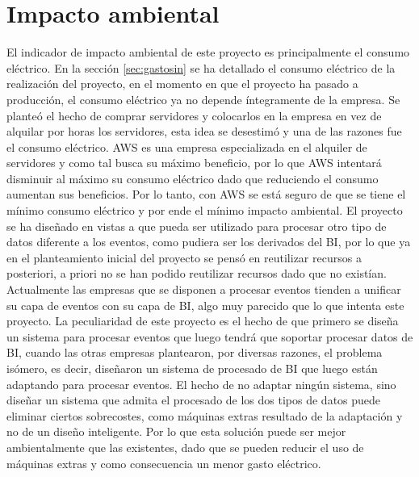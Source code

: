 \section{Impacto ambiental}\label{sec:imam}
El indicador de impacto ambiental de este proyecto es principalmente el consumo eléctrico. En la sección \ref{sec:gastosin} se ha detallado el consumo eléctrico de la realización del proyecto, en el momento en que el proyecto ha pasado a producción, el consumo eléctrico ya no depende íntegramente de la empresa. Se planteó el hecho de comprar servidores y colocarlos en la empresa en vez de alquilar por horas los servidores, esta idea se desestimó y una de las razones fue el consumo eléctrico. AWS es una empresa especializada en el alquiler de servidores y como tal busca su máximo beneficio, por lo que AWS intentará disminuir al máximo su consumo eléctrico dado que reduciendo el consumo aumentan sus beneficios. Por lo tanto, con AWS se está seguro de que se tiene el mínimo consumo eléctrico y por ende el mínimo impacto ambiental.
El proyecto se ha diseñado en vistas a que pueda ser utilizado para procesar otro tipo de datos diferente a los eventos, como pudiera ser los derivados del BI, por lo que ya en el planteamiento inicial del proyecto se pensó en reutilizar recursos a posteriori, a priori no se han podido reutilizar recursos dado que no existían. 
Actualmente las empresas que se disponen a procesar eventos tienden a unificar su capa de eventos con su capa de BI, algo muy parecido que lo que intenta este proyecto. La peculiaridad de este proyecto es el hecho de que primero se diseña un sistema para procesar eventos que luego tendrá que soportar procesar datos de BI, cuando las otras empresas plantearon, por diversas razones, el problema isómero, es decir, diseñaron un sistema de procesado de BI que luego están adaptando para procesar eventos. El hecho de no adaptar ningún sistema, sino diseñar un sistema que admita el procesado de los dos tipos de datos puede eliminar ciertos sobrecostes, como máquinas extras resultado de la adaptación y no de un diseño inteligente. Por lo que esta solución puede ser mejor ambientalmente que las existentes, dado que se pueden reducir el uso de máquinas extras y como consecuencia un menor gasto eléctrico.


